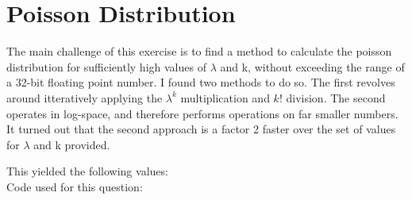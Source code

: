\section{Poisson Distribution}

The main challenge of this exercise is to find a method to calculate the 
poisson distribution for sufficiently high values of $\lambda$ and k, without 
exceeding the range of a 32-bit floating point number.
I found two methods to do so. The first revolves around itteratively applying
the $\lambda^k$ multiplication and $k!$ division. The second operates in
log-space, and therefore performs operations on far smaller numbers.
It turned out that the second approach is a factor 2 faster over the set of
values for $\lambda$ and k provided.



\noindent
This yielded the following values:\\


\noindent
Code used for this question:



